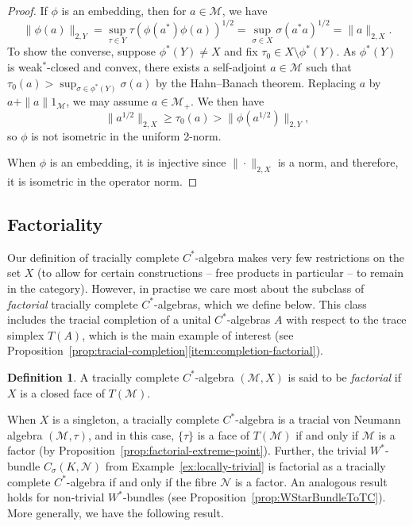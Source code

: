 \documentclass[a4paper,11pt]{amsart}
\theoremstyle{definition}
\newtheorem{definition}[theorem]{Definition}
\numberwithin{equation}{section}
\numberwithin{theorem}{section}
\newcommand{\M}{\mathcal{M}}
\begin{document}
\begin{proof}
	If $\phi$ is an embedding, then for $a\in\mathcal M$, we have
 \begin{equation}
 \|\phi(a)\|_{2,Y}=\sup_{\tau\in Y}\tau(\phi(a^*)\phi(a))^{1/2}=\sup_{\sigma\in X}\sigma(a^*a)^{1/2}=\|a\|_{2,X}.
 \end{equation}
To show the converse, suppose $\phi^*(Y) \neq X$ and fix $\tau_0 \in X \setminus \phi^*(Y)$. As $\phi^*(Y)$ is weak$^*$-closed and convex, there exists a self-adjoint $a \in \M$ such that $\tau_0(a) > \sup_{\sigma \in \phi^*(Y)} \sigma(a)$ by the Hahn--Banach theorem.  Replacing $a$ by $a + \|a\| 1_\M$, we may assume $a \in \M_+$. We then have 
\begin{equation}
    \|a^{1/2}\|_{2, X} \geq \tau_0(a) > \|\phi(a^{1/2})\|_{2, Y},
\end{equation} 
so $\phi$ is not isometric in the uniform 2-norm.

When $\phi$ is an embedding, it is injective since $\|\cdot\|_{2,X}$ is a norm, and therefore, it is isometric in the operator norm.
\end{proof}

\subsection{Factoriality}\label{sec:fact}

Our definition of tracially complete $C^*$-algebra makes very few restrictions on the set $X$ (to allow for certain constructions -- free products in particular -- to remain in the category). However, in practise we care most about the subclass of \emph{factorial} tracially complete $C^*$-algebras, which we define below. This class includes the tracial completion of a unital $C^*$-algebras $A$ with respect to the trace simplex $T(A)$, which is the main example of interest (see Proposition~\ref{prop:tracial-completion}\ref{item:completion-factorial}).

\begin{definition}\label{def:factorial}
	A tracially complete $C^*$-algebra $(\M, X)$ is said to be \emph{factorial} if $X$ is a closed face of $T(\M)$.
\end{definition} 

When $X$ is a singleton, a tracially complete $C^*$-algebra is a tracial von Neumann algebra $(\M, \tau)$, and in this case, $\{\tau\}$ is a face of $T(\M)$ if and only if $\M$ is a factor (by Proposition~\ref{prop:factorial-extreme-point}). 
Further, the trivial $W^*$-bundle $C_\sigma(K, \mathcal{N})$ from Example~\ref{ex:locally-trivial} is factorial as a tracially complete $C^*$-algebra if and only if the fibre $\mathcal {N}$ is a factor.  An analogous result holds for non-trivial $W^*$-bundles (see Proposition~\ref{prop:WStarBundleToTC}).  More generally, we have the following result.
\end{document}
